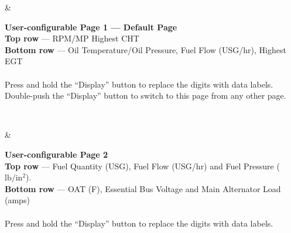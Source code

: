 \begin{longtable}
\begin{minipage}{\eistableleftcol}
\end{minipage}
& 
\begin{minipage}{\eistablerightcol} 
  \vspace{
\tabletopspace} \textbf{User-configurable Page 1 --- Default Page}\\
\textbf{Top row} --- RPM/MP Highest CHT\\
\textbf{Bottom row} --- Oil Temperature/Oil Pressure, Fuel Flow (USG/hr), Highest EGT\\\\
Press and hold the ``Display'' button to replace the digits with data labels.\\
Double-push the ``Display'' button to switch to this page from any other page. \vspace{
\tablebottomspace} 
\end{minipage}
\\
\hline

\begin{minipage}{\eistableleftcol}
\end{minipage}&
\begin{minipage}{\eistablerightcol}
\vspace{\tabletopspace}
\textbf{User-configurable Page 2}\\
\textbf{Top row} --- Fuel Quantity (USG), Fuel Flow (USG/hr) and Fuel Pressure ($\mathrm{lb/in^{2}}$).\\
\textbf{Bottom row} --- OAT (\textdegree F), Essential Bus Voltage and Main Alternator Load (amps)\\\\
Press and hold the ``Display'' button to replace the digits with data labels.
\vspace{\tablebottomspace}
\end{minipage}\\
\hline


\end{longtable}
